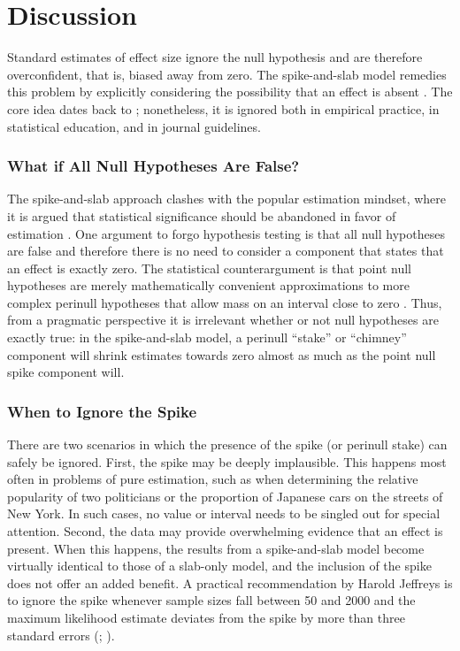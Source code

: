 \documentclass[a4paper]{article}
\begin{document}
\section*{Discussion}
Standard estimates of effect size ignore the null hypothesis and are therefore overconfident, that is, biased away from zero. The spike-and-slab model remedies this problem by explicitly considering the possibility that an effect is absent \cite{Robinson2019,RouderEtAl2018PBR}. The core idea dates back to ; nonetheless, it is ignored both in empirical practice, in statistical education, and in journal guidelines.

\subsubsection*{What if All Null Hypotheses Are False?}
The spike-and-slab approach clashes with the popular estimation mindset, where it is argued that statistical significance should be abandoned in favor of estimation \cite{McShane2019abandon, Cumming2016introduction, valentine2015life, Cumming2014}. One argument to forgo hypothesis testing is that all null hypotheses are false \cite{Cohen1990, Meehl1978} and therefore there is no need to consider a component that states that an effect is exactly zero. The statistical counterargument is that point null hypotheses are merely mathematically convenient approximations to more complex perinull hypotheses that allow mass on an interval close to zero \cite{BergerDelampady1987, KiersTendeiro2019}. Thus, from a pragmatic perspective it is irrelevant whether or not null hypotheses are exactly true: in the spike-and-slab model, a perinull ``stake'' or ``chimney'' \cite{KiersTendeiro2019} component will shrink estimates towards zero almost as much as the point null spike component will. 

\subsubsection*{When to Ignore the Spike}
There are two scenarios in which the presence of the spike (or perinull stake) can safely be ignored. First, the spike may be deeply implausible. This happens most often in problems of pure estimation, such as when determining the relative popularity of two politicians or the proportion of Japanese cars on the streets of New York. In such cases, no value or interval needs to be singled out for special attention. Second, the data may provide overwhelming evidence that an effect is present. When this happens, the results from a spike-and-slab model become virtually identical to those of a slab-only model, and the inclusion of the spike does not offer an added benefit. A practical recommendation by Harold Jeffreys is to ignore the spike whenever sample sizes fall between 50 and 2000 and the maximum likelihood estimate deviates from the spike by more than three standard errors (; ).
\end{document}
